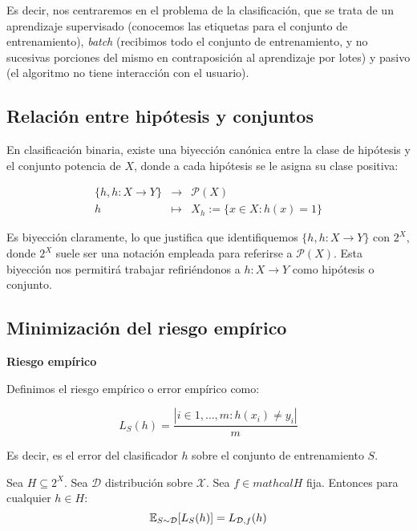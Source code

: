 Es decir, nos centraremos en el problema de la clasificación, que se trata de un aprendizaje supervisado (conocemos las etiquetas para
el conjunto de entrenamiento), \emph{batch} (recibimos todo el conjunto de entrenamiento, y no sucesivas porciones del mismo en
contraposición al aprendizaje por lotes) y pasivo (el algoritmo no tiene interacción con el usuario).

\subsection{Relación entre hipótesis y conjuntos}
En clasificación binaria, existe una biyección canónica entre la clase de hipótesis y el conjunto potencia de $X$, donde
a cada hipótesis se le asigna su clase positiva:

\begin{equation}
 \begin{array}{rcl} 
  \{h, h:X \rightarrow Y\} & \longrightarrow & \mathcal{P}(X) \\
  h & \longmapsto & X_h := \{x\in X: h(x) = 1\}
 \end{array}
 \label{biyeccion-canonica} 
\end{equation}

Es biyección claramente, lo que justifica que identifiquemos $\{h, h:X \rightarrow Y\}$ con $2^X$, donde $2^X$ suele ser una notación
empleada para referirse a $\mathcal{P}(X)$. Esta biyección nos permitirá trabajar refiriéndonos a $h:X \rightarrow Y$ 
como hipótesis o conjunto.

\subsection{Minimización del riesgo empírico}

\begin{definition} \textbf{Riesgo empírico}

Definimos el riesgo empírico o error empírico como:

\[L_S(h) = \frac{|i\in {1,\ldots, m}: h(x_i) \neq y_i|}{m}\]

\end{definition}

Es decir, es el error del clasificador $h$ sobre el conjunto de entrenamiento $S$. 

\begin{fact}
Sea $H\subseteq 2^X$. Sea $\mathcal{D}$ distribución sobre $\mathcal{X}$. Sea $f \in mathcal{H}$ fija. Entonces para
cualquier $h\in H$:
\[\mathbb{E}_{S\sim \mathcal{D}} [L_S(h)] = L_{\mathcal{D},f}(h)\]

\end{fact}


